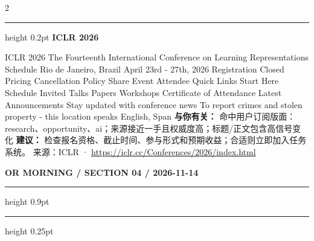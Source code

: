 \documentclass[10.5pt]{ctexart}
\begin{document}
\begin{multicols}{2}
\vspace{2mm}
\hrule height 0.2pt
\vspace{2mm}
{\large\bfseries ICLR 2026}\par
ICLR 2026 The Fourteenth International Conference on Learning Representations Schedule Rio de Janeiro, Brazil April 23rd - 27th, 2026 Registration Closed Pricing Cancellation Policy Share Event Attendee Quick Links Start Here Schedule Invited Talks Papers Workshops Certificate of Attendance Latest Announcements Stay updated with conference news To report crimes and stolen property - this location speaks English, Span
\textbf{与你有关：} 命中用户订阅版面：research、opportunity、ai；来源接近一手且权威度高；标题/正文包含高信号变化
\textbf{建议：} 检查报名资格、截止时间、参与形式和预期收益；合适则立即加入任务系统。
{\footnotesize\color{ormuted} 来源：ICLR · \url{https://iclr.cc/Conferences/2026/index.html}}
\end{multicols}
\newpage
{\small\bfseries OR MORNING / SECTION 04 / 2026-11-14}
\vspace{2mm}
\hrule height 0.9pt
\vspace{1.5mm}
\hrule height 0.25pt
\vspace{4mm}
\end{document}
